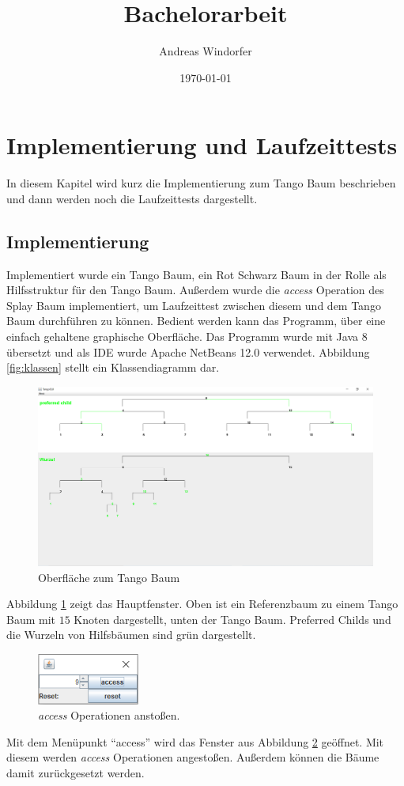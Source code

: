 \documentclass[a4paper,12pt]{article}
\title{Bachelorarbeit}
\author{
	Andreas Windorfer\\
}
\date{\today}
\begin{document}
\tableofcontents
\section{Implementierung und Laufzeittests}
In diesem Kapitel wird kurz die Implementierung zum Tango Baum beschrieben und dann werden noch die Laufzeittests dargestellt. 
\subsection{Implementierung}
Implementiert wurde ein Tango Baum, ein Rot Schwarz Baum in der Rolle als Hilfsstruktur für den Tango Baum. Außerdem wurde die \textit{access} Operation des Splay Baum implementiert, um Laufzeittest zwischen diesem und dem Tango Baum durchführen zu können. Bedient werden kann das Programm, über eine einfach gehaltene graphische Oberfläche. Das Programm wurde mit Java 8 übersetzt und als IDE wurde Apache NetBeans 12.0 verwendet. Abbildung \ref{fig:klassen} stellt ein Klassendiagramm dar.
\begin{figure}[H]
	\centering
	\includegraphics[width= 1\textwidth]{"Medien/laufzeittest/MainGUI"}
	\caption{Oberfläche zum Tango Baum}
	\label{fig:TangoBaumGui}
\end{figure}

\noindent Abbildung \ref{fig:TangoBaumGui} zeigt das Hauptfenster. Oben ist ein Referenzbaum zu einem Tango Baum mit  $15$ Knoten dargestellt, unten der Tango Baum. Preferred Childs und die Wurzeln von Hilfsbäumen sind grün dargestellt.


\begin{figure}[H]
	\centering
	\includegraphics[width=0.3\textwidth]{"Medien/laufzeittest/accessGUI"}
	\caption{\textit{access} Operationen anstoßen.}
	\label{fig:accessGui}
\end{figure}
\noindent Mit dem Menüpunkt \enquote{access} wird das Fenster aus Abbildung \ref{fig:accessGui} geöffnet. Mit diesem werden \textit{access} Operationen angestoßen. Außerdem können die Bäume damit zurückgesetzt werden.
\end{document}
